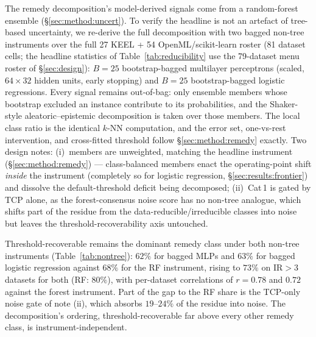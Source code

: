 The remedy decomposition's model-derived signals come from a random-forest
ensemble (\S\ref{sec:method:uncert}). To verify the headline is not an
artefact of tree-based uncertainty, we re-derive the full decomposition with
two bagged non-tree instruments over the full 27 KEEL + 54
OpenML/scikit-learn roster (81 dataset cells; the headline statistics of
Table~\ref{tab:reducibility} use the 79-dataset menu roster of \S\ref{sec:design}): $B{=}25$
bootstrap-bagged multilayer perceptrons (scaled, $64{\times}32$ hidden units,
early stopping) and $B{=}25$ bootstrap-bagged logistic regressions. Every
signal remains out-of-bag: only ensemble members whose bootstrap excluded an
instance contribute to its probabilities, and the Shaker-style
aleatoric--epistemic decomposition is taken over those members. The local
class ratio is the identical $k$-NN computation, and the error set, one-vs-rest
intervention, and cross-fitted threshold follow \S\ref{sec:method:remedy}
exactly. Two design notes: (i)~members
are unweighted, matching the headline instrument (\S\ref{sec:method:remedy}) ---
class-balanced members enact the operating-point shift
\emph{inside} the instrument (completely so for logistic regression,
\S\ref{sec:results:frontier}) and dissolve the default-threshold deficit being
decomposed; (ii)~Cat\,1 is gated by TCP alone, as the forest-consensus noise
score has no non-tree analogue, which shifts part of the residue from the
data-reducible/irreducible classes into noise but leaves the
threshold-recoverability axis untouched.

\begin{table}[t]
\centering
\caption{Remedy decomposition by instrument (means over datasets with
$\ge 5$ minority errors; definitions of \S\ref{sec:method:remedy}). The
threshold-recoverable share, the paper's headline, is stable across
instruments; the per-dataset correlation with the RF instrument is given in
the last column. The non-tree instruments assign more of the residue to noise
(TCP-only gate, note (ii)).}
\label{tab:nontree}
\footnotesize

\end{table}

Threshold-recoverable remains the dominant remedy class under both non-tree
instruments (Table~\ref{tab:nontree}): $62\%$ for bagged MLPs and $63\%$ for
bagged logistic regression against $68\%$ for the RF instrument, rising to
$73\%$ on $\mathrm{IR}>3$ datasets for both (RF: $80\%$), with per-dataset
correlations of $r=0.78$ and $0.72$ against the forest instrument. Part of the
gap to the RF share is the TCP-only noise gate of note (ii), which absorbs
$19$--$24\%$ of the residue into noise. The decomposition's ordering,
threshold-recoverable far above every other remedy class, is
instrument-independent.

